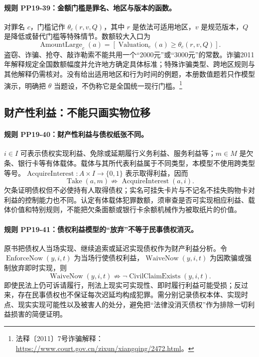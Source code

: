\paragraph{规则 PP19-39：金额门槛是罪名、地区与版本的函数。}
\mbox{}\par
对罪名 $c$，门槛记作 $\theta_c(r,v,Q)$，其中 $r$ 是依法可适用地区，$v$ 是规范版本，$Q$ 是降低或替代门槛等特殊情节。数额较大入口为
\[
\operatorname{AmountLarge}_c(a)
=[\operatorname{Valuation}_c(a)\ge\theta_c(r,v,Q)].
\]
盗窃、诈骗、抢夺、敲诈勒索不能共用一个“2000元”或“3000元”的常数。诈骗2011年解释规定全国数额幅度并允许地方确定具体标准；特殊诈骗类型、跨地区规则与其他解释仍需核对。没有给出适用地区和行为时间的例题，本册数值题若只作模型演示，明确把 $\theta$ 当题设，不伪称它是全国统一现行门槛。\footnote{法释〔2011〕7号诈骗解释：\url{https://www.court.gov.cn/zixun/xiangqing/2472.html}。}

\subsection{财产性利益：不能只画实物位移}
\paragraph{规则 PP19-40：财产性利益与债权纸张不同。}
\mbox{}\par
$i\in I$ 可表示债权实现利益、免除或延期履行义务利益、服务利益等；$m\in M$ 是欠条、银行卡等有体载体。载体与其所代表利益属于不同类型，本模型不使用跨类型等号。$\operatorname{AcquireInterest}:A\times I\to\{0,1\}$ 表示取得利益，因而
\[
\operatorname{Take}(a,m)\not\Rightarrow\operatorname{AcquireInterest}(a,i).
\]
欠条证明债权但不必使持有人取得债权；实名可挂失卡片与不记名不挂失购物卡对利益的控制能力也不同。认定有体载体犯罪数额，须审查是否可实现相应利益、载体价值和特别规则，不能把欠条面额或银行卡余额机械作为被取纸片的价值。

\paragraph{规则 PP19-41：债权利益模型的“放弃”不等于民事债权消灭。}
\mbox{}\par
原书把债权人当场实现、继续追索或延迟实现债权作为财产利益分析。令 $\operatorname{EnforceNow}(y,i,t)$ 为当场行使债权利益，$\operatorname{WaiveNow}(y,i,t)$ 为因欺骗或强制放弃即时实现，则
\[
\operatorname{WaiveNow}(y,i,t)
\not\Rightarrow\neg\operatorname{CivilClaimExists}(y,i,t).
\]
即使民法上仍可诉请履行，刑法上现实可实现性、即时履行利益可能受损；反过来，存在民事债权也不保证每次迟延均构成犯罪。需分别记录债权本体、实现时点、现实实现可能性以及被害人的处分，避免把“法律没消灭债权”作为排除一切利益损害的简便证明。

